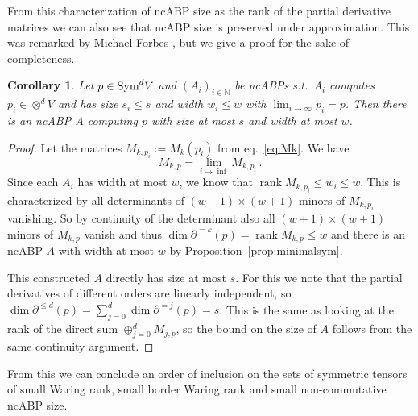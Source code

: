 \documentclass[10pt,a4paper]{article}
\numberwithin{equation}{section}
\newtheorem{corollary}[equation]{Corollary}
\theoremstyle{definition}
\newcommand{\Sym}{\textup{Sym}}
\newcommand{\IN}{\mathbb{N}}
\DeclareMathOperator{\rank}{rank}
\begin{document}
From this characterization of ncABP size as the rank of the partial derivative matrices we can also see that ncABP size is preserved under approximation.
This was remarked by Michael Forbes \cite{forbesWACT16}, but we give a proof for the sake of completeness.
\begin{corollary}
    \label{cor:abpclosure}
    Let $p \in \Sym^d V$ and $(A_i)_{i \in \IN}$ be ncABPs s.t.\ $A_i$ computes $p_i \in \otimes^d V$ and has size $s_i \leq s$ and width $w_i \leq w$ with $\lim_{i \to \infty}p_i = p$.
    Then there is an ncABP $A$ computing $p$ with size at most $s$ and width at most $w$.
\end{corollary}
\begin{proof}
    Let the matrices $M_{k,p_i} := M_k(p_i)$ from eq.~\eqref{eq:Mk}.
%
    We have
    \[
        M_{k,p} = \lim_{i \to \inf} M_{k, p_i}\,.
    \]
    Since each $A_i$ has width at most $w$, we know that $\rank M_{k,p_i} \leq w_i \leq w$.
    This is characterized by all determinants of $(w+1) \times (w+1)$ minors of $M_{k,p_i}$ vanishing.
    So by continuity of the determinant also all $(w+1) \times (w+1)$ minors of $M_{k,p}$ vanish and thus $\dim \partial^{=k}(p) =\rank M_{k,p} \leq w$ and there is an ncABP $A$ with width at most $w$ by Proposition~\ref{prop:minimalsym}.

    This constructed $A$ directly has size at most $s$. For this we note that the partial derivatives of different orders are linearly independent, so $\dim \partial^{\leq d}(p) = \sum_{j=0}^d \dim \partial^{=j}(p) = s$.
    This is the same as looking at the rank of the direct sum $\oplus_{j=0}^d M_{j,p}$, so the bound on the size of $A$ follows from the same continuity argument.
\end{proof}

From this we can conclude an order of inclusion on the sets of symmetric tensors of small Waring rank, small border Waring rank and small non-commutative ncABP size.
\end{document}
